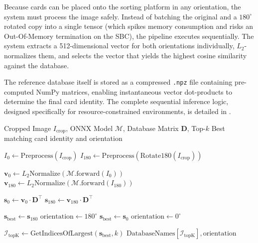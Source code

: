 Because cards can be placed onto the sorting platform in any orientation, the system must process the image safely. Instead of batching the original and a $180^\circ$ rotated copy into a single tensor (which spikes memory consumption and risks an Out-Of-Memory termination on the \ac{SBC}), the pipeline executes sequentially. The system extracts a 512-dimensional vector for both orientations individually, $L_2$-normalizes them, and selects the vector that yields the highest cosine similarity against the database. 

The reference database itself is stored as a compressed \texttt{.npz} file containing pre-computed NumPy matrices, enabling instantaneous vector dot-products to determine the final card identity. The complete sequential inference logic, designed specifically for resource-constrained environments, is detailed in .
\begin{algorithm}[htbp]
    \caption{Resource-Constrained Orientation Selection and Retrieval}
    \label{alg:inference}
    \begin{algorithmic}[1]
    \Require Cropped Image $I_{\text{crop}}$, ONNX Model $\mathcal{M}$, Database Matrix $\mathbf{D}$, Top-$k$
    \Ensure Best matching card identity and orientation

    \State $I_0 \gets \text{Preprocess}(I_{\text{crop}})$
    \State $I_{180} \gets \text{Preprocess}(\text{Rotate180}(I_{\text{crop}}))$

    \State $\mathbf{v}_0 \gets L_2\text{Normalize}(\mathcal{M}\text{.forward}(I_0))$
    \State $\mathbf{v}_{180} \gets L_2\text{Normalize}(\mathcal{M}\text{.forward}(I_{180}))$

    \State $\mathbf{s}_0 \gets \mathbf{v}_0 \cdot \mathbf{D}^\intercal$ 
    \State $\mathbf{s}_{180} \gets \mathbf{v}_{180} \cdot \mathbf{D}^\intercal$

        \State $\mathbf{s}_{\text{best}} \gets \mathbf{s}_{180}$
        \State $\text{orientation} \gets 180^\circ$
    \Else
        \State $\mathbf{s}_{\text{best}} \gets \mathbf{s}_0$
        \State $\text{orientation} \gets 0^\circ$
    \EndIf

    \State $\mathcal{I}_{\text{topK}} \gets \text{GetIndicesOfLargest}(\mathbf{s}_{\text{best}}, k)$
    \State \Return $\text{DatabaseNames}[\mathcal{I}_{\text{topK}}], \text{orientation}$
    \end{algorithmic}
\end{algorithm}

